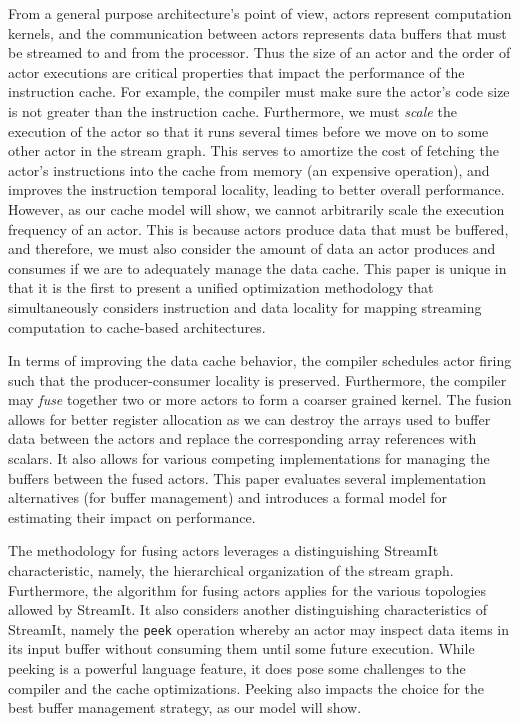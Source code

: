 From a general purpose architecture's point of view, actors represent
computation kernels, and the communication between actors represents
data buffers that must be streamed to and from the processor. Thus
the size of an actor and the
order of actor executions are critical properties that
impact the performance of the instruction cache. For example, the
compiler must make sure the actor's code size is not
greater than the instruction cache. Furthermore, we must {\it scale}
the execution of the actor so that it runs several times before we move
on to some other actor in the stream 
graph. This serves to amortize the cost of fetching the actor's
instructions into the cache from memory (an expensive operation), and
improves the instruction temporal locality, leading to better overall
performance. However, as our cache model will show, we 
cannot arbitrarily scale the execution frequency of an actor. This
is because actors produce data that must be buffered, and therefore,
we must also consider the amount of data an actor produces and
consumes if we are to adequately manage the data cache. This paper is unique
in that it is the first to present a unified optimization methodology
that simultaneously considers instruction and data locality for
mapping streaming computation to cache-based architectures.

In terms of improving the data cache behavior, the compiler schedules
actor firing such that the producer-consumer locality is
preserved. Furthermore,  the compiler may {\it fuse}
together two or more actors to form a coarser grained kernel.
The fusion allows for better register allocation as we can
destroy the arrays used to buffer data between the actors and replace
the corresponding array references with scalars.  It also allows for
various competing implementations for managing the buffers between the
fused actors.  This paper evaluates several implementation
alternatives (for buffer management) and introduces a formal model for
estimating their impact on performance.

The methodology for fusing actors leverages a distinguishing StreamIt
characteristic, namely, the hierarchical organization of
the stream graph. Furthermore, the algorithm for fusing actors applies
for the various topologies allowed by StreamIt.
It also considers another distinguishing characteristics of StreamIt,
namely the {\tt peek} operation whereby an actor may inspect data
items in its input buffer without consuming them until some future
execution. While peeking is a powerful language feature, it does pose
some challenges to the compiler and the cache optimizations. Peeking
also impacts the choice for the best buffer management strategy, as our
model will show.


